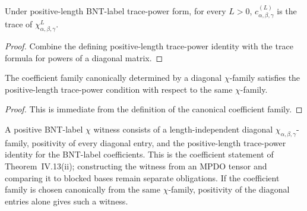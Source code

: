 \begin{theorem}%
    \label{thm:mpdo_bnt_label_chi_eq_trace_matrix_pow}
    \leanok
    Under positive-length BNT-label trace-power form, for every $L>0$,
    $c^{(L)}_{\alpha,\beta,\gamma}$ is the trace of
    $\chi_{\alpha,\beta,\gamma}^{L}$.
\end{theorem}
\begin{proof}\leanok
    Combine the defining positive-length trace-power identity with the trace
    formula for powers of a diagonal matrix.
\end{proof}

\begin{theorem}%
    \label{thm:mpdo_bnt_label_of_chi_positive_length_trace_power}
    \leanok
    The coefficient family canonically determined by a diagonal
    $\chi$-family satisfies the positive-length trace-power condition with
    respect to the same $\chi$-family.
\end{theorem}
\begin{proof}\leanok
    This is immediate from the definition of the canonical coefficient family.
\end{proof}

\begin{definition}%
    \label{def:mpdo_positive_bnt_label_chi_trace_power_form}
    \leanok
    A positive BNT-label $\chi$ witness consists of a length-independent
    diagonal $\chi_{\alpha,\beta,\gamma}$-family, positivity of every
    diagonal entry, and the positive-length trace-power identity for the
    BNT-label coefficients. This is the coefficient statement of
    Theorem~IV.13(ii); constructing the witness from an MPDO tensor and
    comparing it to blocked bases remain separate obligations.
    If the coefficient family is chosen canonically from the same
    $\chi$-family, positivity of the diagonal entries alone gives such a
    witness.
\end{definition}

